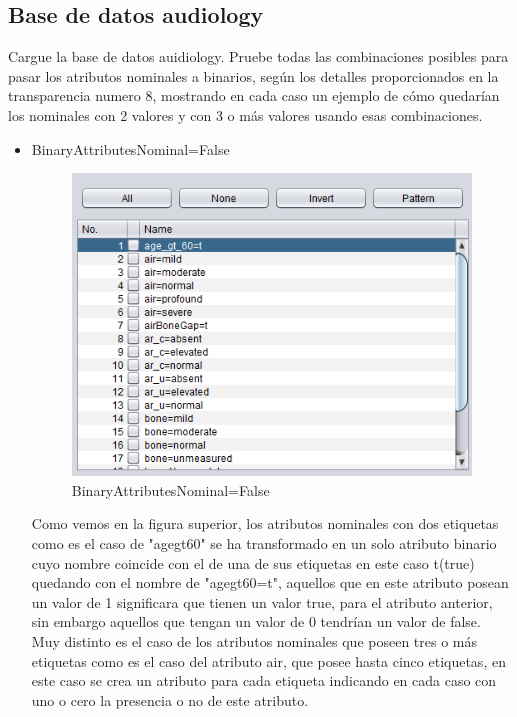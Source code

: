 \subsection{Base de datos audiology}
Cargue la base de datos auidiology. Pruebe todas las combinaciones posibles para pasar los atributos nominales a binarios, según los detalles proporcionados en la transparencia numero 8, mostrando en cada caso un ejemplo de cómo quedarían los nominales con 2 valores y con 3 o más valores usando esas combinaciones.
\begin{itemize}
    \item BinaryAttributesNominal=False
    \begin{figure}[H]
    \centering
    \includegraphics[width=\textwidth]{img/BAN=False.PNG}
    \caption{BinaryAttributesNominal=False}
\end{figure}

Como vemos en la figura superior, los atributos nominales con dos etiquetas como es el caso de "agegt60" se ha transformado en un solo atributo binario cuyo nombre coincide con el de una de sus etiquetas en este caso t(true) quedando con el nombre de "agegt60=t", aquellos que en este atributo posean un valor de 1 significara que tienen un valor true, para el atributo anterior, sin embargo aquellos que tengan un valor de 0 tendrían un valor de false.
Muy distinto es el caso de los atributos nominales que poseen tres o más etiquetas como es el caso del atributo air, que posee hasta cinco etiquetas, en este caso se crea un atributo para cada etiqueta indicando en cada caso con uno o cero la presencia o no de este atributo.
\end{itemize}


